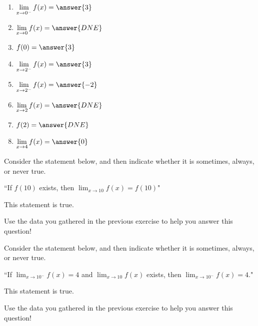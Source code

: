 \documentclass[handout]{ximera}
\begin{document}
\begin{exercise}
\begin{enumerate}
\item $\displaystyle\lim_{x\to 0^-} f(x) = \answer{3}$ 

\item $\displaystyle\lim_{x\to 0} f(x) = \answer{DNE}$ 

\item $f(0) = \answer{3}$

\item $\displaystyle\lim_{x\to 2^-} f(x) =\answer{3}$ 

\item $\displaystyle\lim_{x\to 2^-} f(x) = \answer{-2}$ 

\item $\displaystyle\lim_{x\to 2} f(x) = \answer{DNE}$ 

\item $f(2) = \answer{DNE}$

\item $\displaystyle\lim_{x\to 4} f(x) = \answer{0}$ 

\end{enumerate}

\end{exercise}

\begin{exercise}

Consider the statement below, and then indicate whether it is sometimes, always, or never true.

``If $f(10)$ exists, then $\displaystyle\lim_{x\to 10} f(x) = f(10)$"

This statement is  true.

\begin{hint}

Use the data you gathered in the previous exercise to help you answer this question!  

\end{hint}

\end{exercise}

\begin{exercise}

Consider the statement below, and then indicate whether it is sometimes, always, or never true.

``If $\displaystyle\lim_{x\to 10^-} f(x) = 4$ and $\displaystyle\lim_{x\to 10} f(x)$ exists, then $\displaystyle\lim_{x\to 10^-} f(x) = 4.$"

This statement is  true.

\begin{hint}

Use the data you gathered in the previous exercise to help you answer this question!  

\end{hint}

\end{exercise}
\end{document}
